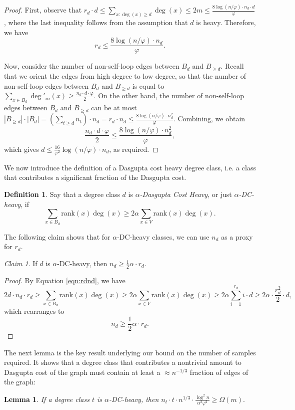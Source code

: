 \documentclass[letterpaper,11pt]{article}
\newcommand{\rank}{\mathrm{rank}}
\theoremstyle{plain}
\newtheorem{lemma}[theorem]{Lemma}
\theoremstyle{definition}
\newtheorem{definition}[theorem]{Definition}
\theoremstyle{remark}
\newtheorem{claim}{Claim}
\begin{document}
\begin{proof}
  First, observe that $r_d \cdot d \leq \sum_{x : \deg(x) \geq d} \deg(x) \leq 2m \leq \frac{8 \log(n /\varphi)  \cdot n_d \cdot d}{\varphi}$, where the last inequality follows from the assumption that $d$ is heavy. Therefore, we have \[r_d \leq \frac{8 \log(n /\varphi) \cdot  n_d}{\varphi}.\]

 Now, consider the number of non-self-loop edges between $B_d$ and $B_{\geq d}$. Recall that we orient the edges from high degree to low degree, so that the number of non-self-loop edges between $B_d$ and $B_{\geq d}$ is equal to $\sum_{x \in B_d} \deg'_{in}(x) \geq \frac{n_d \cdot d \cdot \varphi}{2 }.$ On the other hand, the number of non-self-loop edges between $B_d$ and $B_{\geq d}$ can be at most $|B_{\geq d}| \cdot |B_d| = \left(\sum_{t \geq d}n_t \right)\cdot n_d = r_d \cdot n_d \leq  \frac{8\log(n /\varphi)\cdot n_d^2}{\varphi}  $. 
    Combining, we obtain  
\[  \frac{n_d \cdot d \cdot \varphi }{2 } \leq \frac{8\log(n /\varphi)\cdot n_d^2}{\varphi} , \]
which gives $d \leq \frac{16}{\varphi^2} \log(n/\varphi) \cdot n_d$, as required. 
\end{proof}
We now introduce the definition of a Dasgupta cost heavy degree class, i.e. a class that contributes a significant fraction of the Dasgupta cost. 
\begin{definition}
    Say that a degree class $d$ is \emph{$\alpha$-Dasgupta Cost Heavy}, or just \emph{$\alpha$-DC-heavy}, if 
    \begin{equation*} \sum_{x\in B_d} \rank(x) \deg(x) \geq 2 \alpha \sum_{x\in V} \rank(x) \deg(x).\end{equation*} 
\end{definition}
The following claim shows that for $\alpha$-DC-heavy classes, we can use $n_d$ as a proxy for $r_d$. 
\begin{claim}\label{claim:rankbound}
    If $d$ is $\alpha$-DC-heavy, then $n_d \geq\frac{1}{2} \alpha \cdot r_d.$ 
\end{claim}
\begin{proof}
By Equation \eqref{eqn:rdnd}, we have
\[2d \cdot  n_d \cdot r_d  \geq \sum_{x \in B_d} \rank(x) \deg(x) \geq 2\alpha \sum_{x \in V} \rank(x) \deg(x) \geq 2\alpha \sum_{i = 1}^{r_d} i \cdot d \geq 2\alpha\cdot \frac{r_d^2}{2}\cdot d,\]
which rearranges to 
\[n_d \geq \frac{1}{2}\alpha \cdot r_d.\]
\end{proof}

The next lemma is the key result underlying our bound on the number of samples required. It shows that a degree class that contributes a nontrivial amount to Dasgupta cost of the graph must contain at least a $\approx n^{-1/3}$ fraction of edges of the graph:
\begin{lemma}\label{lemma:heav_deg_class}
    If a degree class $t$ is $\alpha$-DC-heavy, then  $n_t \cdot t  \cdot n^{1/3}\cdot \frac{\log^2 n}{\alpha^2 \varphi^2}  \geq \Omega(m). $
\end{lemma}
\end{document}
